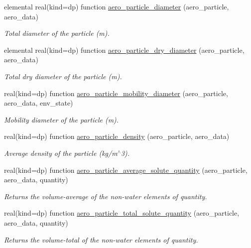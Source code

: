 \begin{DoxyCompactItemize}
elemental real(kind=dp) function \mbox{\hyperlink{namespacepmc__aero__particle_af994784058490064bddb39303202b919}{aero\+\_\+particle\+\_\+diameter}} (aero\+\_\+particle, aero\+\_\+data)
\begin{DoxyCompactList}\small\item\em Total diameter of the particle (m). \end{DoxyCompactList}\item 
elemental real(kind=dp) function \mbox{\hyperlink{namespacepmc__aero__particle_a3fd3219998b2c59283ad7c51bf59fd4b}{aero\+\_\+particle\+\_\+dry\+\_\+diameter}} (aero\+\_\+particle, aero\+\_\+data)
\begin{DoxyCompactList}\small\item\em Total dry diameter of the particle (m). \end{DoxyCompactList}\item 
real(kind=dp) function \mbox{\hyperlink{namespacepmc__aero__particle_a238e9238bf464acfce55838436c0d668}{aero\+\_\+particle\+\_\+mobility\+\_\+diameter}} (aero\+\_\+particle, aero\+\_\+data, env\+\_\+state)
\begin{DoxyCompactList}\small\item\em Mobility diameter of the particle (m). \end{DoxyCompactList}\item 
real(kind=dp) function \mbox{\hyperlink{namespacepmc__aero__particle_a7390039f97b4cefc54456bd951138b36}{aero\+\_\+particle\+\_\+density}} (aero\+\_\+particle, aero\+\_\+data)
\begin{DoxyCompactList}\small\item\em Average density of the particle (kg/m$^\wedge$3). \end{DoxyCompactList}\item 
real(kind=dp) function \mbox{\hyperlink{namespacepmc__aero__particle_a461f8f91322c817e32292d9fa5f618f2}{aero\+\_\+particle\+\_\+average\+\_\+solute\+\_\+quantity}} (aero\+\_\+particle, aero\+\_\+data, quantity)
\begin{DoxyCompactList}\small\item\em Returns the volume-\/average of the non-\/water elements of quantity. \end{DoxyCompactList}\item 
real(kind=dp) function \mbox{\hyperlink{namespacepmc__aero__particle_a203722f122db295d8077019ec20a1d65}{aero\+\_\+particle\+\_\+total\+\_\+solute\+\_\+quantity}} (aero\+\_\+particle, aero\+\_\+data, quantity)
\begin{DoxyCompactList}\small\item\em Returns the volume-\/total of the non-\/water elements of quantity. \end{DoxyCompactList}\item 

\end{DoxyCompactItemize}
